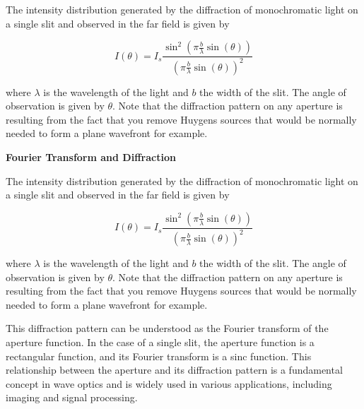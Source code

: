 \documentclass[
  a4paper,
]{book}
\begin{document}
\begin{tcolorbox}[enhanced jigsaw, coltitle=black, title=\textcolor{quarto-callout-note-color}{\faInfo}\hspace{0.5em}{Single Slit Diffraction}, colframe=quarto-callout-note-color-frame, toprule=.15mm, opacitybacktitle=0.6, left=2mm, opacityback=0, breakable, toptitle=1mm, bottomtitle=1mm, leftrule=.75mm, arc=.35mm, titlerule=0mm, colbacktitle=quarto-callout-note-color!10!white, rightrule=.15mm, bottomrule=.15mm, colback=white]

The intensity distribution generated by the diffraction of monochromatic
light on a single slit and observed in the far field is given by

\[
I(\theta)=I_s\frac{\sin^2\left (\pi \frac{b}{\lambda}\sin(\theta)\right)}{\left( \pi \frac{b}{\lambda}\sin(\theta)\right)^2}
\]

where \(\lambda\) is the wavelength of the light and \(b\) the width of
the slit. The angle of observation is given by \(\theta\). Note that the
diffraction pattern on any aperture is resulting from the fact that you
remove Huygens sources that would be normally needed to form a plane
wavefront for example.

\textbf{Fourier Transform and Diffraction}

The intensity distribution generated by the diffraction of monochromatic
light on a single slit and observed in the far field is given by

\[
I(\theta)=I_s\frac{\sin^2\left (\pi \frac{b}{\lambda}\sin(\theta)\right)}{\left( \pi \frac{b}{\lambda}\sin(\theta)\right)^2}
\]

where \(\lambda\) is the wavelength of the light and \(b\) the width of
the slit. The angle of observation is given by \(\theta\). Note that the
diffraction pattern on any aperture is resulting from the fact that you
remove Huygens sources that would be normally needed to form a plane
wavefront for example.

This diffraction pattern can be understood as the Fourier transform of
the aperture function. In the case of a single slit, the aperture
function is a rectangular function, and its Fourier transform is a sinc
function. This relationship between the aperture and its diffraction
pattern is a fundamental concept in wave optics and is widely used in
various applications, including imaging and signal processing.

\end{tcolorbox}
\end{document}
